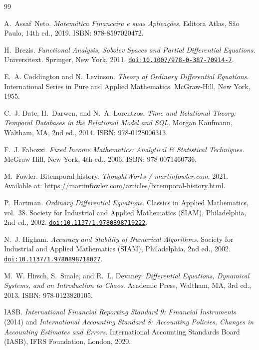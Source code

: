 \documentclass[11pt, a4paper]{article}
\newcommand{\doi}[1]{\href{https://doi.org/#1}{\texttt{doi:#1}}}
\theoremstyle{definition}
\theoremstyle{plain}
\theoremstyle{remark}
\begin{document}
\begin{thebibliography}{99}

A.~Assaf~Neto.
\newblock \emph{Matem{\'a}tica Financeira e suas Aplica{\c{c}}{\~o}es}.
\newblock Editora Atlas, S{\~a}o Paulo, 14th ed., 2019.
\newblock ISBN: 978-8597020472.

H.~Brezis.
\newblock \emph{Functional Analysis, Sobolev Spaces and Partial Differential Equations}.
\newblock Universitext. Springer, New York, 2011.
\newblock \doi{10.1007/978-0-387-70914-7}.

E.~A. Coddington and N.~Levinson.
\newblock \emph{Theory of Ordinary Differential Equations}.
\newblock International Series in Pure and Applied Mathematics. McGraw-Hill, New York, 1955.

C.~J. Date, H.~Darwen, and N.~A. Lorentzos.
\newblock \emph{Time and Relational Theory: Temporal Databases in the Relational Model and SQL}.
\newblock Morgan Kaufmann, Waltham, MA, 2nd ed., 2014.
\newblock ISBN: 978-0128006313.

F.~J. Fabozzi.
\newblock \emph{Fixed Income Mathematics: Analytical \& Statistical Techniques}.
\newblock McGraw-Hill, New York, 4th ed., 2006.
\newblock ISBN: 978-0071460736.

M.~Fowler.
\newblock Bitemporal history.
\newblock \emph{ThoughtWorks / martinfowler.com}, 2021.
\newblock Available at: \url{https://martinfowler.com/articles/bitemporal-history.html}.

P.~Hartman.
\newblock \emph{Ordinary Differential Equations}.
\newblock Classics in Applied Mathematics, vol.~38. Society for Industrial and Applied Mathematics (SIAM), Philadelphia, 2nd ed., 2002.
\newblock \doi{10.1137/1.9780898719222}.

N.~J. Higham.
\newblock \emph{Accuracy and Stability of Numerical Algorithms}.
\newblock Society for Industrial and Applied Mathematics (SIAM), Philadelphia, 2nd ed., 2002.
\newblock \doi{10.1137/1.9780898718027}.

M.~W. Hirsch, S.~Smale, and R.~L. Devaney.
\newblock \emph{Differential Equations, Dynamical Systems, and an Introduction to Chaos}.
\newblock Academic Press, Waltham, MA, 3rd ed., 2013.
\newblock ISBN: 978-0123820105.

IASB.
\newblock \emph{International Financial Reporting Standard 9: Financial Instruments} (2014) and \emph{International Accounting Standard 8: Accounting Policies, Changes in Accounting Estimates and Errors}.
\newblock International Accounting Standards Board (IASB), IFRS Foundation, London, 2020.


\end{thebibliography}
\end{document}
